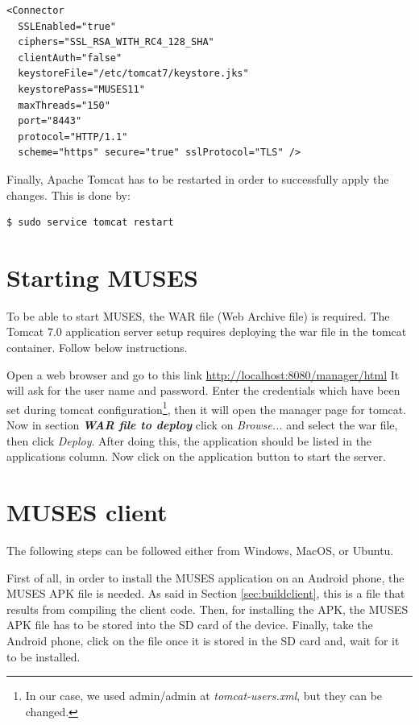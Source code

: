\documentclass[a4paper,11pt]{book}
\begin{document}
\begin{verbatim}
<Connector
  SSLEnabled="true"
  ciphers="SSL_RSA_WITH_RC4_128_SHA"
  clientAuth="false"
  keystoreFile="/etc/tomcat7/keystore.jks"
  keystorePass="MUSES11"
  maxThreads="150"
  port="8443"
  protocol="HTTP/1.1"
  scheme="https" secure="true" sslProtocol="TLS" />
\end{verbatim}

Finally, Apache Tomcat has to be restarted in order to successfully apply the changes. This is done by:

\begin{verbatim}
$ sudo service tomcat restart
\end{verbatim}

\section{Starting MUSES}
\label{sec:musestart}

To be able to start MUSES, the WAR file (Web Archive file) is required. %
The Tomcat 7.0 application server setup requires deploying the war file in the tomcat container. Follow below instructions. 

Open a web browser and go to this link
\url{http://localhost:8080/manager/html} 
It will ask for the user name and password. Enter the credentials which have been set during tomcat configuration\footnote{In our case, we used admin/admin at \textit{tomcat-users.xml}, but they can be changed.}, then it will open the manager page for tomcat. Now in section \textit{\textbf{WAR file to deploy}} click on \textit{Browse...} and select the war file, then click \textit{Deploy}. 
After doing this, the application should be listed in the applications column. Now click on the application button to start the server.

\section{MUSES client}
\label{sec:musesclient}

The following steps can be followed either from Windows, MacOS, or Ubuntu.

First of all, in order to install the MUSES application on an Android phone, the MUSES APK file is needed. As said in Section \ref{sec:buildclient}, this is a file that results from compiling the client code. Then, for installing the APK, the MUSES APK file has to be stored into the SD card of the device. Finally, take the Android phone, click on the file once it is stored in the SD card and, wait for it to be installed.
\end{document}
